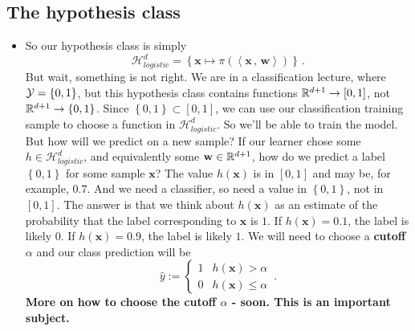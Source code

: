 \documentclass[11pt]{article}
\newcommand{\Hc}{\mathcal{H}}
\newcommand{\innerr}[2]{{\left\langle #1\,,\,#2 \right\rangle}}
\newcommand{\VV}[1]{\mathbf{#1}}
\begin{document}
  \subsection{The hypothesis class}
  \begin{itemize}
    \item So our hypothesis class is simply 
      \[
	\Hc_{logistic}^d= \left\{ \VV{x} \mapsto \pi(\innerr{\VV{x}}{\VV{w}} ) \right\}\,.
      \]
      But wait, something is not right.  We are in a classification lecture, where
      $\mathcal{Y}=\left\{ 0,1 \right\}$, but this hypothesis class contains functions 
      $\mathbb{R}^{d+1} \to [0,1]$, not $\mathbb{R}^{d+1} \to \left\{ 0,1 \right\}$. 
      Since $\left\{ 0,1 \right\}\subset [0,1]$, we can use
      our classification training sample to choose a function in
      $\Hc_{logistic}^d$. So we'll
      be able to train the model. But how will we 
      predict on a new sample? If our learner chose some $h\in\Hc_{logistic}^d$, and
      equivalently some $\VV{w}\in \reals^{d+1}$, how do we predict a label
      $\left\{ 0,1 \right\}$ for some sample $\VV{x}$? The value $h(\VV{x})$ is in
      $[0,1]$ and may be, for example, $0.7$. And we need a classifier, so need
      a value in $\left\{ 0,1 \right\}$, not in $[0,1]$.
      The answer is that we think about $h(\VV{x})$ as an estimate of the
      probability that the label corresponding to $\VV{x}$  is $1$. If
      $h(\VV{x})=0.1$, the label is likely $0$. If $h(\VV{x})=0.9$, the label is
      likely $1$. We will need to choose a {\bf cutoff} $\alpha$ and our class
      prediction will be 
      \[\hat{y} := \begin{cases} 1 & h(\VV{x})>\alpha \\ 0 &
      h(\VV{x}) \leq \alpha \end{cases}\,.\]
      {\bf More on how to choose the cutoff $\alpha$ - 
      soon. This is an important subject.}
      \end{itemize}
\end{document}

